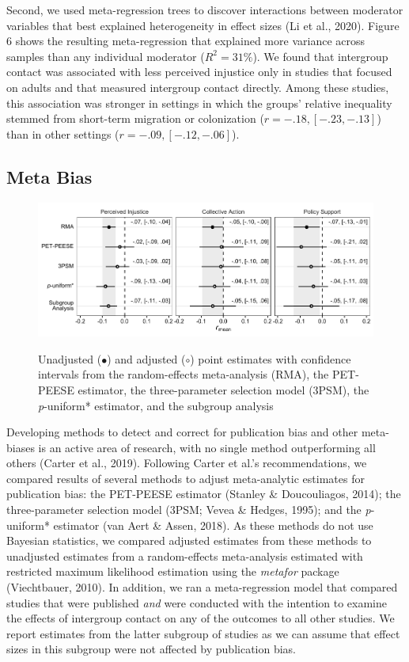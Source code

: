 \documentclass[twocolumn, 11pt, letterpaper]{article}
\begin{document}
Second, we used meta-regression trees to discover interactions between
moderator variables that best explained heterogeneity in effect sizes
(Li et al., 2020). Figure 6 shows the resulting meta-regression that
explained more variance across samples than any individual moderator
(\(R^2 = 31\%\)). We found that intergroup contact was associated with
less perceived injustice only in studies that focused on adults and that
measured intergroup contact directly. Among these studies, this
association was stronger in settings in which the groups' relative
inequality stemmed from short-term migration or colonization
(\(r = -.18, [-.23, -.13]\)) than in other settings
(\(r = -.09, [-.12, -.06]\)).

\hypertarget{meta-bias}{%
\subsection{Meta Bias}\label{meta-bias}}

\begin{figure}
\centering
\caption{Unadjusted ($\bullet$) and adjusted ($\circ$) point estimates with confidence intervals from the random-effects meta-analysis (RMA), the PET-PEESE estimator, the three-parameter selection model (3PSM), the \textit{p}-uniform* estimator, and the subgroup analysis}
\includegraphics[scale=1]{../figures/figure-7}
\label{fig:f7}
\end{figure}

Developing methods to detect and correct for publication bias and other
meta-biases is an active area of research, with no single method
outperforming all others (Carter et al., 2019). Following Carter et
al.'s recommendations, we compared results of several methods to adjust
meta-analytic estimates for publication bias: the PET-PEESE estimator
(Stanley \& Doucouliagos, 2014); the three-parameter selection model
(3PSM; Vevea \& Hedges, 1995); and the \emph{p}-uniform* estimator (van
Aert \& Assen, 2018). As these methods do not use Bayesian statistics,
we compared adjusted estimates from these methods to unadjusted
estimates from a random-effects meta-analysis estimated with restricted
maximum likelihood estimation using the \emph{metafor} package
(Viechtbauer, 2010). In addition, we ran a meta-regression model that
compared studies that were published \emph{and} were conducted with the
intention to examine the effects of intergroup contact on any of the
outcomes to all other studies. We report estimates from the latter
subgroup of studies as we can assume that effect sizes in this subgroup
were not affected by publication bias.
\end{document}
